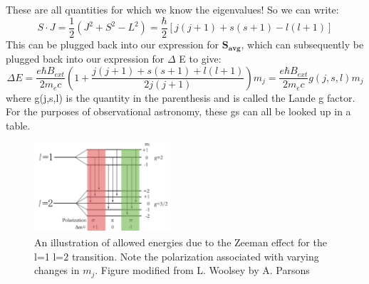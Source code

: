 \documentclass{article}
\begin{document}
These are all quantities for which we know the eigenvalues! So we can write:
\begin{equation}
S \cdot J = \frac{1}{2}(J^2 +S^2 - L^2) = \frac{\hbar}{2}[j(j+1) +s(s+1) - l(l+1)]
\end{equation}
This can be plugged back into our expression for $\mathbf{S_{avg}}$, which can subsequently be plugged back into our expression for $\Delta$ E to give:
\begin{equation} 
\Delta E = \frac{e \hbar B_{ext}}{2m_ec} \left(1+ \frac{j(j+1) +s(s+1) +l(l+1)}{2j(j+1)}\right) m_j =  \frac{e \hbar B_{ext}}{2m_ec} g(j, s, l) m_j
\end{equation}
where g(j,s,l) is the quantity in the parenthesis and is called the Lande g factor. For the purposes of observational astronomy, these gs can all be looked up in a table. 

\begin{figure}
    \centering
    \includegraphics[width = 0.45\textwidth]{800px-Zeeman_Splitting.png}
    \caption{An illustration of allowed energies due to the Zeeman effect for the l=1 l=2 transition. Note the polarization associated with varying changes in $m_j$. Figure modified from L. Woolsey by A. Parsons}
    \label{fig:zeeman}
\end{figure}
\end{document}
